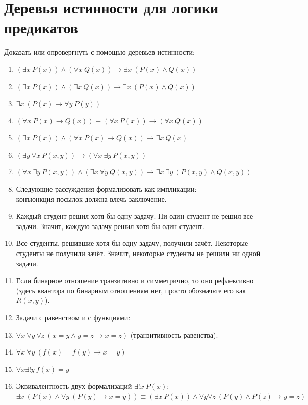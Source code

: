 \documentclass{article}
\newcommand{\itemhard}{\refstepcounter{enumi}\item[\theenumi$^\star$.]}
\begin{document}
\section{Деревья истинности для логики предикатов}
Доказать или опровергнуть с помощью деревьев истинности:
\begin{enumerate}
    \item $(\exists x~P(x))\land(\forall x~Q(x))\to\exists x~(P(x)\land Q(x))$
    \item $(\exists x~P(x))\land(\exists x~Q(x))\to\exists x~(P(x)\land Q(x))$
    \item $\exists x~(P(x) \to \forall y~P(y))$
    \item $(\forall x~P(x)\to Q(x))\equiv(\forall x~P(x))\to(\forall x~Q(x))$
    \item $(\exists x~P(x))\land(\forall x~P(x)\to Q(x))\to\exists x~Q(x)$
    \item $(\exists y~\forall x~P(x,y))\to(\forall x~\exists y~P(x,y))$
    \item $(\forall x~\exists y~P(x,y))\land(\exists x~\forall y~Q(x,y))\to\exists x~\exists y~(P(x,y)\land Q(x,y))$
    \item[] Следующие рассуждения формализовать как импликации:\\ конъюнкция посылок должна влечь заключение.
    \item Каждый студент решил хотя бы одну задачу. Ни один студент не решил все задачи. Значит, каждую задачу решил хотя бы один студент.
    \item Все студенты, решившие хотя бы одну задачу, получили зачёт. Некоторые студенты не получили зачёт. Значит, некоторые студенты не решили ни одной задачи.
    \item Если бинарное отношение транзитивно и симметрично, то оно рефлексивно (здесь квантора по бинарным отношениям нет, просто обозначьте его как $R(x,y)$).
    \item[] Задачи с равенством и с функциями:
    \item $\forall x~\forall y~\forall z~(x=y\land y=z\to x=z)$ (транзитивность равенства).
    \item $\forall x~\forall y~(f(x)=f(y)\to x=y)$
    \item $\forall x \exists! y~f(x)=y$
    \itemhard Эквивалентность двух формализаций $\exists! x~P(x)$:\\$\exists x~(P(x) \land \forall y~(P(y) \to x=y)) \equiv (\exists x~P(x)) \land \forall y \forall z~(P(y) \land P(z) \to y=z)$
\end{enumerate}
\end{document}
